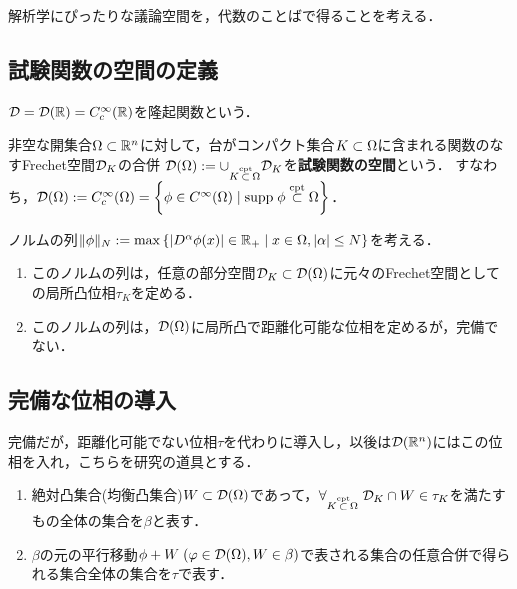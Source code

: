 \documentclass[uplatex,dvipdfmx]{jsreport}
\begin{document}
\begin{tcolorbox}[colframe=ForestGreen, colback=ForestGreen!10!white,breakable,colbacktitle=ForestGreen!40!white,coltitle=black,fonttitle=\bfseries\sffamily,
title=]
    解析学にぴったりな議論空間を，代数のことばで得ることを考える．
\end{tcolorbox}

\subsection{試験関数の空間の定義}

\begin{notation}
    $\mathcal{D}=\mathcal{D}(\mathbb{R})=C_c^\infty(\mathbb{R})$を隆起関数という．
\end{notation}

\begin{definition}
    非空な開集合$\Omega\subset\mathbb{R}^n$に対して，台がコンパクト集合$K\subset\Omega$に含まれる関数のなすFrechet空間$\mathcal{D}_K$の合併
    $\mathcal{D}(\Omega):=\cup_{K\overset{\textrm{cpt}}{\subset}\Omega}\mathcal{D}_K$を\textbf{試験関数の空間}という．
    すなわち，$\mathcal{D}(\Omega):=C^\infty_c(\Omega)=\left\{\phi\in C^\infty(\Omega)\mid\mathrm{supp}\;\phi\overset{\textrm{cpt}}{\subset}\Omega\right\}$．
\end{definition}

\begin{lemma}
    ノルムの列$\|\phi\|_N:=\max\left\{\lvert D^\alpha\phi(x)\rvert\in\mathbb{R}_+\mid x\in\Omega,\lvert\alpha\rvert\le N\right\}$を考える．
    \begin{enumerate}
        \item このノルムの列は，任意の部分空間$\mathcal{D}_K\subset\mathcal{D}(\Omega)$に元々のFrechet空間としての局所凸位相$\tau_K$を定める．
        \item このノルムの列は，$\mathcal{D}(\Omega)$に局所凸で距離化可能な位相を定めるが，完備でない．
    \end{enumerate}
\end{lemma}

\subsection{完備な位相の導入}

\begin{tcolorbox}[colframe=ForestGreen, colback=ForestGreen!10!white,breakable,colbacktitle=ForestGreen!40!white,coltitle=black,fonttitle=\bfseries\sffamily,
title=]
    完備だが，距離化可能でない位相$\tau$を代わりに導入し，以後は$\mathcal{D}(\mathbb{R}^n)$にはこの位相を入れ，こちらを研究の道具とする．
\end{tcolorbox}

\begin{definition}\mbox{}
    \begin{enumerate}
        \item 絶対凸集合(均衡凸集合)$W\subset\mathcal{D}(\Omega)$であって，$\forall_{K\overset{\textrm{cpt}}{\subset}\Omega}\;\mathcal{D}_K\cap W\in\tau_K$を満たすもの全体の集合を$\beta$と表す．
        \item $\beta$の元の平行移動$\phi+W\;(\varphi\in\mathcal{D}(\Omega),W\in\beta)$で表される集合の任意合併で得られる集合全体の集合を$\tau$で表す．
    \end{enumerate}
\end{definition}
\end{document}

